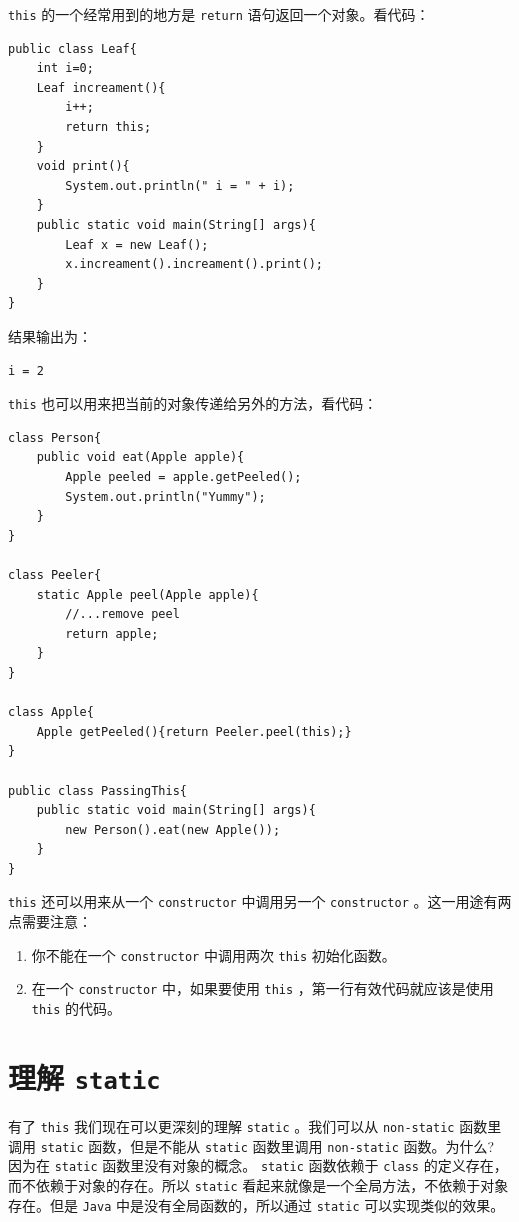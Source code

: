 \documentclass[10pt,a4paper,UTF8]{article}
\begin{document}
\texttt{this} 的一个经常用到的地方是 \texttt{return} 语句返回一个对象。看代码：
\lstset{language=java,label= ,caption= ,captionpos=b,firstnumber=1,numbers=left}
\begin{lstlisting}
public class Leaf{
    int i=0;
    Leaf increament(){
        i++;
        return this;
    }
    void print(){
        System.out.println(" i = " + i);
    }
    public static void main(String[] args){
        Leaf x = new Leaf();
        x.increament().increament().print();
    }
}
\end{lstlisting}
结果输出为：
\begin{verbatim}
i = 2
\end{verbatim}
\texttt{this} 也可以用来把当前的对象传递给另外的方法，看代码：
\lstset{language=java,label= ,caption= ,captionpos=b,firstnumber=1,numbers=left}
\begin{lstlisting}
class Person{
    public void eat(Apple apple){
        Apple peeled = apple.getPeeled();
        System.out.println("Yummy");
    }
}

class Peeler{
    static Apple peel(Apple apple){
        //...remove peel
        return apple;
    }
}

class Apple{
    Apple getPeeled(){return Peeler.peel(this);}
}

public class PassingThis{
    public static void main(String[] args){
        new Person().eat(new Apple());
    }
}
\end{lstlisting}
\texttt{this} 还可以用来从一个 \texttt{constructor} 中调用另一个 \texttt{constructor} 。这一用途有两点需要注意：
\begin{enumerate}
\item 你不能在一个 \texttt{constructor} 中调用两次 \texttt{this} 初始化函数。
\item 在一个 \texttt{constructor} 中，如果要使用 \texttt{this} ，第一行有效代码就应该是使用 \texttt{this} 的代码。
\end{enumerate}


\section{理解 \texttt{static}}
\label{sec:org08c2f90}


有了 \texttt{this} 我们现在可以更深刻的理解 \texttt{static} 。我们可以从 \texttt{non-static} 函数里调用 \texttt{static} 函数，但是不能从 \texttt{static} 函数里调用 \texttt{non-static} 函数。为什么? 因为在 \texttt{static} 函数里没有对象的概念。 \texttt{static} 函数依赖于 \texttt{class} 的定义存在，而不依赖于对象的存在。所以 \texttt{static} 看起来就像是一个全局方法，不依赖于对象存在。但是 \texttt{Java} 中是没有全局函数的，所以通过 \texttt{static} 可以实现类似的效果。
\end{document}
